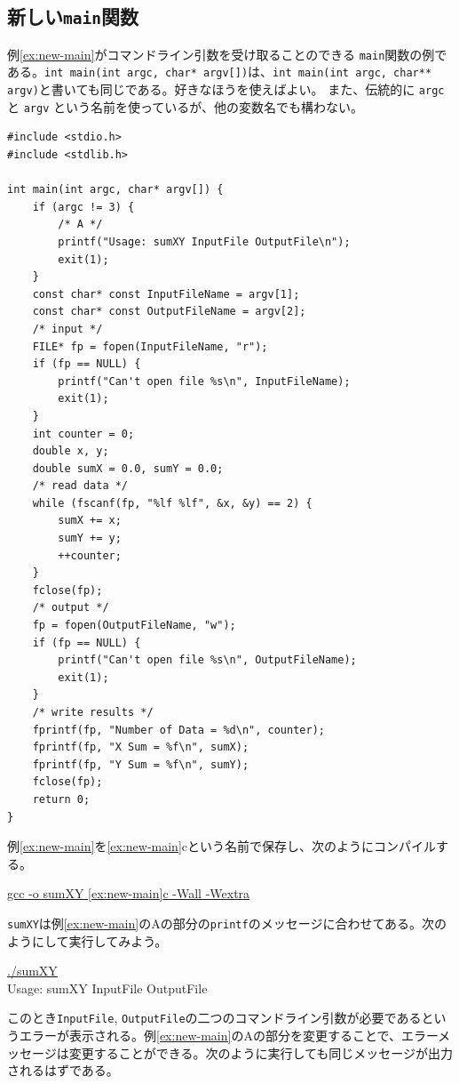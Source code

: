 \subsection{新しい\texttt{main}関数}

例\ref{ex:new-main}がコマンドライン引数を受け取ることのできる \texttt{main}関数の例である。\texttt{int main(int argc, char* argv[])}は、\texttt{int main(int argc, char** argv)}と書いても同じである。好きなほうを使えばよい。
また、伝統的に \texttt{argc} と \texttt{argv} という名前を使っているが、他の変数名でも構わない。
\begin{reidai}\label{ex:new-main}
    \begin{verbatim}
#include <stdio.h>
#include <stdlib.h>

int main(int argc, char* argv[]) {
    if (argc != 3) {
        /* A */
        printf("Usage: sumXY InputFile OutputFile\n");
        exit(1);
    }
    const char* const InputFileName = argv[1];
    const char* const OutputFileName = argv[2];
    /* input */
    FILE* fp = fopen(InputFileName, "r");
    if (fp == NULL) {
        printf("Can't open file %s\n", InputFileName);
        exit(1);
    }
    int counter = 0;
    double x, y;
    double sumX = 0.0, sumY = 0.0;
    /* read data */
    while (fscanf(fp, "%lf %lf", &x, &y) == 2) {
        sumX += x;
        sumY += y;
        ++counter;
    }
    fclose(fp);
    /* output */
    fp = fopen(OutputFileName, "w");
    if (fp == NULL) {
        printf("Can't open file %s\n", OutputFileName);
        exit(1);
    }
    /* write results */
    fprintf(fp, "Number of Data = %d\n", counter);
    fprintf(fp, "X Sum = %f\n", sumX);
    fprintf(fp, "Y Sum = %f\n", sumY);
    fclose(fp);
    return 0;
}
\end{verbatim}
\end{reidai} \noindent
例\ref{ex:new-main}を\ref{ex:new-main}cという名前で保存し、次のようにコンパイルする。
\begin{commandline2}
    \prompt \underline{gcc -o sumXY \ref{ex:new-main}c -Wall -Wextra}
\end{commandline2} \noindent
\texttt{sumXY}は例\ref{ex:new-main}のAの部分の\texttt{printf}のメッセージに合わせてある。次のようにして実行してみよう。
\begin{commandline2}
    \prompt \underline{./sumXY}\\
    Usage: sumXY InputFile OutputFile
\end{commandline2} \noindent
このとき\texttt{InputFile}, \texttt{OutputFile}の二つのコマンドライン引数が必要であるというエラーが表示される。例\ref{ex:new-main}のAの部分を変更することで、エラーメッセージは変更することができる。次のように実行しても同じメッセージが出力されるはずである。
